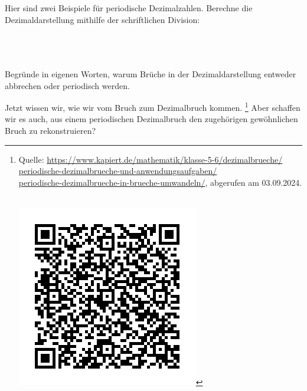 \newpage
\begin{xmpl}
	Hier sind zwei Beispiele für periodische Dezimalzahlen. Berechne die Dezimaldarstellung mithilfe der schriftlichen Division:\\
 
	\\~\\
	\\
\end{xmpl}

Begründe in eigenen Worten, warum Brüche in der Dezimaldarstellung entweder abbrechen oder periodisch werden.\\

Jetzt wissen wir, wie wir vom Bruch zum Dezimalbruch kommen.%
\footnote{\begin{minipage}[t]{.85\linewidth}
			Quelle: \url{https://www.kapiert.de/mathematik/klasse-5-6/dezimalbrueche/}\\\url{periodische-dezimalbrueche-und-anwendungsaufgaben/}\\
			\url{periodische-dezimalbrueche-in-brueche-umwandeln/}, abgerufen am 03.09.2024.
		\end{minipage}
		\hfill
		\begin{minipage}[t]{.1\linewidth}
			~\\\vspace{-.8cm}
			\includegraphics[width=\linewidth]{figures/QR-periodischeBrueche}
		\end{minipage}}
Aber schaffen wir es auch, aus einem periodischen Dezimalbruch den zugehörigen gewöhnlichen Bruch zu rekonstruieren?\\

